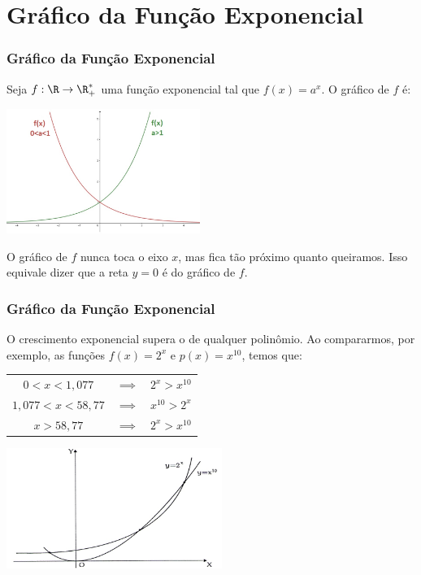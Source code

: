 \documentclass[10pt]{beamer}
\begin{document}
\section{Gráfico da Função Exponencial}
\begin{frame}
\frametitle{Gráfico da Função Exponencial} %

\begin{exemplo}
Seja $f: \R \to \R_+^\ast$ uma função exponencial tal que $f(x) =
a^x$. O gráfico de $f$ é:
\begin{center}
\includegraphics[width=6.3cm]{figures/grafexp.jpg}
\end{center}
O gráfico de $f$ nunca toca o eixo $x$, mas fica tão próximo quanto
queiramos. Isso equivale dizer que a reta $y=0$ é  do
gráfico de $f$.
\end{exemplo}

\end{frame}




\begin{frame}
\frametitle{Gráfico da Função Exponencial} %

\begin{exemplo}
O crescimento exponencial supera o de qualquer polinômio. Ao
compararmos, por exemplo, as funções $f(x) = 2^x$ e
$p(x)=x^{10}$, temos que:\\
\begin{tabular}{ccc}
$0<x<1{,}077$ & $\implies$ & $2^x > x^{10}$\\
$1{,}077 < x < 58{,}77$ & $\implies$ & $x^{10} > 2^x$\\
$x>58{,}77$ & $\implies $& $2^x > x^{10}$
\end{tabular}
\begin{center}
\includegraphics[width=7cm]{figures/polXexp.jpg}
\end{center}
\end{exemplo}

\end{frame}
\end{document}
